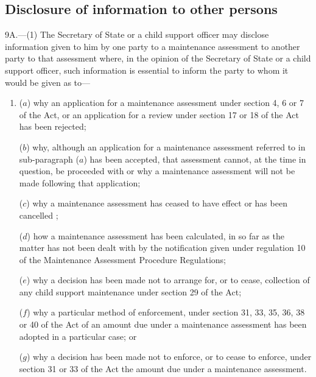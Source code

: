\documentclass[a4paper]{article}
\begin{document}
\subsection[9A. Disclosure of information to other persons]{Disclosure of information to other persons}

9A.—(1) The Secretary of State or a child support officer may disclose information given to him by one party to a maintenance assessment to another party to that assessment where, in the opinion of the Secretary of State or a child support officer, such information is essential to inform the party to whom it would be given as to—
\begin{enumerate}\item[]
($a$) why an application for a maintenance assessment under section 4, 6 or 7 of the Act, or an application for a review under section 17 or 18 of the Act has been rejected;

($b$) why, although an application for a maintenance assessment referred to in sub-paragraph ($a$) has been accepted, that assessment cannot, at the time in question, be proceeded with or why a maintenance assessment will not be made following that application;

($c$) why a maintenance assessment has ceased to have effect or has been cancelled%
;


($d$) how a maintenance assessment has been calculated, in so far as the matter has not been dealt with by the notification given under regulation 10 of the Maintenance Assessment Procedure Regulations;

($e$) why a decision has been made not to arrange for, or to cease, collection of any child support maintenance under section 29 of the Act;

($f$) why a particular method of enforcement, under section 31, 33, 35, 36, 38 or 40 of the Act of an amount due under a maintenance assessment has been adopted in a particular case; or

($g$) why a decision has been made not to enforce, or to cease to enforce, under section 31 or 33 of the Act the amount due under a maintenance assessment.
\end{enumerate}
\end{document}
